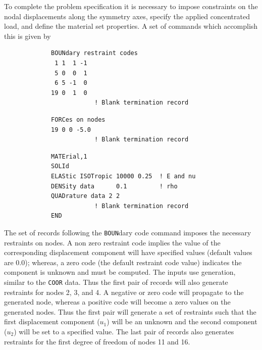 To complete the problem specification it is necessary to impose constraints
on the nodal displacements along the symmetry axes, specify the applied
concentrated load, and define the material set properties.  A set of commands
which accomplish this is given by
\begin{verbatim}
             BOUNdary restraint codes
              1 1  1 -1
              5 0  0  1
              6 5 -1  0
             19 0  1  0
                         ! Blank termination record
\end{verbatim}
\begin{verbatim}
             FORCes on nodes
             19 0 0 -5.0
                         ! Blank termination record
\end{verbatim}
\begin{verbatim}
             MATErial,1
             SOLId
             ELAStic ISOTropic 10000 0.25  ! E and nu
             DENSity data      0.1         ! rho
             QUADrature data 2 2
                         ! Blank termination record
             END
\end{verbatim}
The set of records following the {\tt BOUN}dary code command
imposes the necessary restraints on nodes. A non zero
restraint code implies the value of the corresponding displacement component
will have specified values (default values are 0.0);
whereas, a zero code (the default
restraint code value) indicates the component is unknown and must be computed.
The inputs use generation, similar to the {\tt COOR} data.  Thus the first
pair of records will also generate restraints for nodes 2, 3, and 4.  A negative
or zero code will propagate to the generated node, whereas a positive code
will become a zero values on the generated nodes.  Thus the first pair
will generate a set of restraints such that the first displacement
component ($u_1$) will be an unknown and the second component ($u_2$) will
be set to a specified value.
The last pair of records also generates restraints for the first degree
of freedom of nodes 11 and 16.

